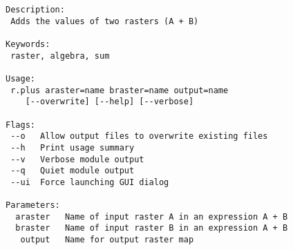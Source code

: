 \documentclass{standalone}
\begin{document}
\begin{lstlisting}[linewidth=34.2em]
Description:
 Adds the values of two rasters (A + B)

Keywords:
 raster, algebra, sum

Usage:
 r.plus araster=name braster=name output=name
    [--overwrite] [--help] [--verbose]

Flags:
 --o   Allow output files to overwrite existing files
 --h   Print usage summary
 --v   Verbose module output
 --q   Quiet module output
 --ui  Force launching GUI dialog

Parameters:
  araster   Name of input raster A in an expression A + B
  braster   Name of input raster B in an expression A + B
   output   Name for output raster map
\end{lstlisting}
\end{document}
